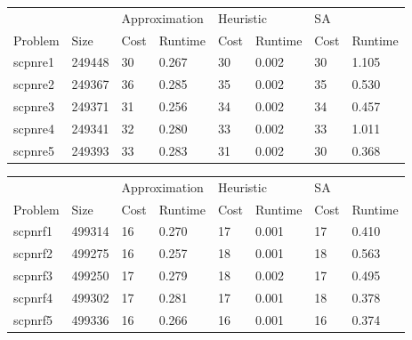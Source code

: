 \begin{table}[]
\centering
\begin{tabular}{@{}llllllll@{}}
\toprule
        &        & \multicolumn{2}{l}{Approximation} & \multicolumn{2}{l}{Heuristic} & \multicolumn{2}{l}{SA} \\
Problem & Size   & Cost           & Runtime          & Cost         & Runtime        & Cost     & Runtime     \\ \midrule
scpnre1 & 249448 & 30             & 0.267            & 30           & 0.002          & 30       & 1.105       \\
scpnre2 & 249367 & 36             & 0.285            & 35           & 0.002          & 35       & 0.530       \\
scpnre3 & 249371 & 31             & 0.256            & 34           & 0.002          & 34       & 0.457       \\
scpnre4 & 249341 & 32             & 0.280            & 33           & 0.002          & 33       & 1.011       \\
scpnre5 & 249393 & 33             & 0.283            & 31           & 0.002          & 30       & 0.368       \\ \bottomrule
\end{tabular}
\end{table}

\begin{table}[]
\centering
\begin{tabular}{@{}llllllll@{}}
\toprule
        &        & \multicolumn{2}{l}{Approximation} & \multicolumn{2}{l}{Heuristic} & \multicolumn{2}{l}{SA} \\
Problem & Size   & Cost           & Runtime          & Cost         & Runtime        & Cost     & Runtime     \\ \midrule
scpnrf1 & 499314 & 16             & 0.270            & 17           & 0.001          & 17       & 0.410       \\
scpnrf2 & 499275 & 16             & 0.257            & 18           & 0.001          & 18       & 0.563       \\
scpnrf3 & 499250 & 17             & 0.279            & 18           & 0.002          & 17       & 0.495       \\
scpnrf4 & 499302 & 17             & 0.281            & 17           & 0.001          & 18       & 0.378       \\
scpnrf5 & 499336 & 16             & 0.266            & 16           & 0.001          & 16       & 0.374       \\ \bottomrule
\end{tabular}
\end{table}

